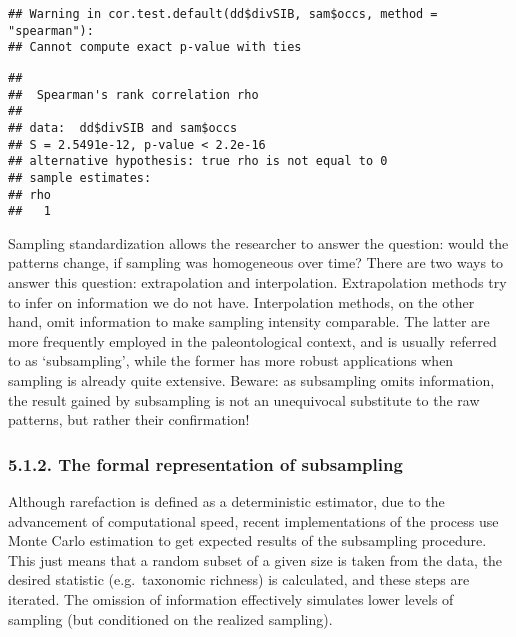 \documentclass[]{article}
\newenvironment{Shaded}{\begin{snugshade}}{\end{snugshade}}
\newcommand{\DataTypeTok}[1]{\textcolor[rgb]{0.13,0.29,0.53}{#1}}
\newcommand{\KeywordTok}[1]{\textcolor[rgb]{0.13,0.29,0.53}{\textbf{#1}}}
\newcommand{\NormalTok}[1]{#1}
\newcommand{\OperatorTok}[1]{\textcolor[rgb]{0.81,0.36,0.00}{\textbf{#1}}}
\newcommand{\StringTok}[1]{\textcolor[rgb]{0.31,0.60,0.02}{#1}}
\begin{document}
\begin{Shaded}
\end{Shaded}

\begin{verbatim}
## Warning in cor.test.default(dd$divSIB, sam$occs, method = "spearman"):
## Cannot compute exact p-value with ties
\end{verbatim}

\begin{verbatim}
## 
##  Spearman's rank correlation rho
## 
## data:  dd$divSIB and sam$occs
## S = 2.5491e-12, p-value < 2.2e-16
## alternative hypothesis: true rho is not equal to 0
## sample estimates:
## rho 
##   1
\end{verbatim}

Sampling standardization allows the researcher to answer the question:
would the patterns change, if sampling was homogeneous over time? There
are two ways to answer this question: extrapolation and interpolation.
Extrapolation methods try to infer on information we do not have.
Interpolation methods, on the other hand, omit information to make
sampling intensity comparable. The latter are more frequently employed
in the paleontological context, and is usually referred to as
`subsampling', while the former has more robust applications when
sampling is already quite extensive. Beware: as subsampling omits
information, the result gained by subsampling is not an unequivocal
substitute to the raw patterns, but rather their confirmation!

\hypertarget{the-formal-representation-of-subsampling}{%
\subsubsection{5.1.2. The formal representation of
subsampling}\label{the-formal-representation-of-subsampling}}

Although rarefaction is defined as a deterministic estimator, due to the
advancement of computational speed, recent implementations of the
process use Monte Carlo estimation to get expected results of the
subsampling procedure. This just means that a random subset of a given
size is taken from the data, the desired statistic (e.g.~taxonomic
richness) is calculated, and these steps are iterated. The omission of
information effectively simulates lower levels of sampling (but
conditioned on the realized sampling).
\end{document}
